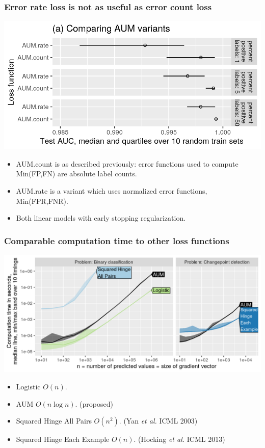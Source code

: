 \documentclass{beamer}
\begin{document}
\begin{frame}
  \frametitle{Error rate loss is not as useful as error count loss}

 \includegraphics[width=\textwidth]{figure-unbalanced-grad-desc-aum.png}

 \begin{itemize}
 \item AUM.count is as described previously: error functions used to
   compute Min(FP,FN) are absolute label counts.
 \item AUM.rate is a variant which uses normalized error functions,
   Min(FPR,FNR).
 \item Both linear models with early stopping regularization.
 \end{itemize}

\end{frame}

\begin{frame}
  \frametitle{Comparable computation time to other loss functions}

\includegraphics[width=\textwidth]{figure-aum-grad-speed-both.png}

\begin{itemize}
\item Logistic $O(n)$. 
\item AUM $O(n\log n)$. (proposed)
\item Squared Hinge All Pairs $O(n^2)$. (Yan \emph{et al.} ICML 2003)
\item Squared Hinge Each Example $O(n)$. (Hocking \emph{et al.} ICML 2013)
\end{itemize}
  
\end{frame}
\end{document}
